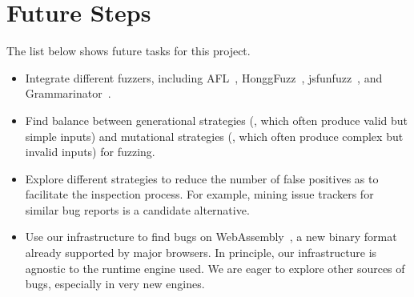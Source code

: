 \documentclass[11pt]{article}
\newcommand{\Fix}[1]{\textbf{[[}{\color{red} #1}\textbf{]]}}
\newcommand{\Igor}[1]{\textbf{[[}{\color{darkaquamarine} #1}\textbf{]]}}
\begin{document}

%
%

\section{Future Steps}

The list below shows future tasks for this project.

\begin{itemize}
\item Integrate different fuzzers, including AFL~\cite{afl},
  HonggFuzz~\cite{honggfuzz}, jsfunfuzz~\cite{jsfunfuzz}, and
  Grammarinator~\cite{grammarinator}.

\item Find balance between generational strategies (, which often
  produce valid but simple inputs) and mutational strategies (, which
  often produce complex but invalid inputs) for fuzzing.

\item Explore different strategies to reduce the number of false
  positives as to facilitate the inspection process. For example,
  mining issue trackers for similar bug reports is a candidate alternative.

\item Use our infrastructure to find bugs on
  WebAssembly~\cite{webassembly}, a new binary format already
  supported by major browsers. In principle, our infrastructure is
  agnostic to the runtime engine used. We are eager to explore other
  sources of bugs, especially in very new engines. 

\end{itemize}  
\end{document}
